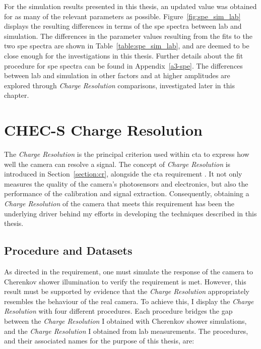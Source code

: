 For the simulation results presented in this thesis, an updated value was obtained for as many of the relevant  parameters as possible. Figure~\ref{fig:spe_sim_lab} displays the resulting differences in terms of the \gls{spe} spectra between lab and simulation. The differences in the parameter values resulting from the fits to the two \gls{spe} spectra are shown in Table~\ref{table:spe_sim_lab}, and are deemed to be close enough for the investigations in this thesis. Further details about the fit procedure for \gls{spe} spectra can be found in Appendix~\ref{a3-spe}. The differences between lab and simulation in other factors and at higher amplitudes are explored through \textit{Charge Resolution} comparisons, investigated later in this chapter.

\section{CHEC-S Charge Resolution}

The \textit{Charge Resolution} is the principal criterion used within \gls{cta} to express how well the camera can resolve a signal. The concept of \textit{Charge Resolution} is introduced in Section~\ref{section:cr}, alongside the \gls{cta} requirement . It not only measures the quality of the camera's photosensors and electronics, but also the performance of the calibration and signal extraction. Consequently, obtaining a \textit{Charge Resolution} of the camera that meets this requirement has been the underlying driver behind my efforts in developing the techniques described in this thesis.

\subsection{Procedure and Datasets} \label{section:crprocedure}

As directed in the  requirement, one must simulate the response of the camera to Cherenkov shower illumination to verify the requirement is met. However, this result must be supported by evidence that the \textit{Charge Resolution} appropriately resembles the behaviour of the real camera. To achieve this, I display the \textit{Charge Resolution} with four different procedures. Each procedure bridges the gap between the \textit{Charge Resolution} I obtained with Cherenkov shower simulations, and the \textit{Charge Resolution} I obtained from lab measurements. The procedures, and their associated names for the purpose of this thesis, are:

